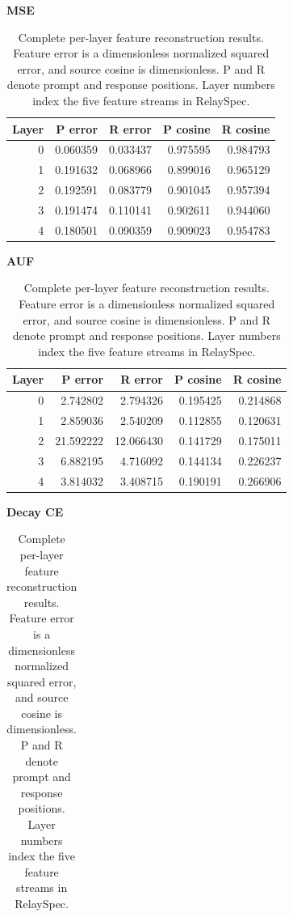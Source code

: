 \begin{table}[htbp]
\centering
\caption{Complete per-layer feature reconstruction results. Feature error is a dimensionless normalized squared error, and source cosine is dimensionless. P and R denote prompt and response positions. Layer numbers index the five feature streams in RelaySpec.}
\label{tab:app-layer-geometry}
\scriptsize
\setlength{\tabcolsep}{2pt}
\begin{minipage}[t]{0.48\linewidth}
\vspace{0pt}
\centering
\textbf{MSE}\par\smallskip
\begin{tabular}{@{}rrrrr@{}}
\toprule
Layer & P error & R error & P cosine & R cosine \\
\midrule
0 & 0.060359 & 0.033437 & 0.975595 & 0.984793 \\
1 & 0.191632 & 0.068966 & 0.899016 & 0.965129 \\
2 & 0.192591 & 0.083779 & 0.901045 & 0.957394 \\
3 & 0.191474 & 0.110141 & 0.902611 & 0.944060 \\
4 & 0.180501 & 0.090359 & 0.909023 & 0.954783 \\
\bottomrule
\end{tabular}
\end{minipage}\hfill
\begin{minipage}[t]{0.48\linewidth}
\vspace{0pt}
\centering
\textbf{AUF}\par\smallskip
\begin{tabular}{@{}rrrrr@{}}
\toprule
Layer & P error & R error & P cosine & R cosine \\
\midrule
0 & 2.742802 & 2.794326 & 0.195425 & 0.214868 \\
1 & 2.859036 & 2.540209 & 0.112855 & 0.120631 \\
2 & 21.592222 & 12.066430 & 0.141729 & 0.175011 \\
3 & 6.882195 & 4.716092 & 0.144134 & 0.226237 \\
4 & 3.814032 & 3.408715 & 0.190191 & 0.266906 \\
\bottomrule
\end{tabular}
\end{minipage}
\par\smallskip
\begin{minipage}[t]{0.48\linewidth}
\vspace{0pt}
\centering
\textbf{Decay CE}\par\smallskip
\begin{tabular}{@{}rrrrr@{}}

\end{tabular}
\end{minipage}
\end{table}

